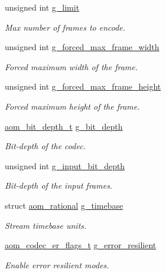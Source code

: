 \begin{DoxyCompactItemize}
unsigned int \hyperlink{structaom__codec__enc__cfg_a71628d182062afe21a884fa584714b74}{g\+\_\+limit}
\begin{DoxyCompactList}\small\item\em Max number of frames to encode. \end{DoxyCompactList}\item 
unsigned int \hyperlink{structaom__codec__enc__cfg_a8349dcee2119c7fb3fd15a0ae6fdcf12}{g\+\_\+forced\+\_\+max\+\_\+frame\+\_\+width}
\begin{DoxyCompactList}\small\item\em Forced maximum width of the frame. \end{DoxyCompactList}\item 
unsigned int \hyperlink{structaom__codec__enc__cfg_a0a02763f4709e7ed87dfa84532d7eaaf}{g\+\_\+forced\+\_\+max\+\_\+frame\+\_\+height}
\begin{DoxyCompactList}\small\item\em Forced maximum height of the frame. \end{DoxyCompactList}\item 
\hyperlink{group__codec_ga90c2026e798a669241dc57464472a198}{aom\+\_\+bit\+\_\+depth\+\_\+t} \hyperlink{structaom__codec__enc__cfg_a76a27f44cded1516803a776a0a7e9038}{g\+\_\+bit\+\_\+depth}
\begin{DoxyCompactList}\small\item\em Bit-\/depth of the codec. \end{DoxyCompactList}\item 
unsigned int \hyperlink{structaom__codec__enc__cfg_a021aed8496604b1ad3af2c51f52d075d}{g\+\_\+input\+\_\+bit\+\_\+depth}
\begin{DoxyCompactList}\small\item\em Bit-\/depth of the input frames. \end{DoxyCompactList}\item 
struct \hyperlink{structaom__rational}{aom\+\_\+rational} \hyperlink{structaom__codec__enc__cfg_a10664f1fc5b6ec29b77ee13efeeecdf7}{g\+\_\+timebase}
\begin{DoxyCompactList}\small\item\em Stream timebase units. \end{DoxyCompactList}\item 
\hyperlink{group__encoder_ga5f326af84993f371bb165883bb5a5a59}{aom\+\_\+codec\+\_\+er\+\_\+flags\+\_\+t} \hyperlink{structaom__codec__enc__cfg_a8f3763485bb1f6eea6466b2fe0da2304}{g\+\_\+error\+\_\+resilient}
\begin{DoxyCompactList}\small\item\em Enable error resilient modes. \end{DoxyCompactList}\item 

\end{DoxyCompactItemize}
